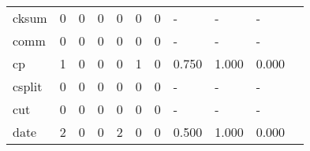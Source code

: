 \begin{longtable}{lp{1.2cm}p{1.2cm}p{1.2cm}p{1.2cm}p{1.2cm}p{1.2cm}p{1.2cm}p{1.2cm}p{1.2cm}p{1.2cm}}
cksum     &                                     0 &                                                  0 &                                                  0 &                                                  0 &                                                  0 &                                                  0 &                                             - &                                                  - &                                                  - \\
comm      &                                     0 &                                                  0 &                                                  0 &                                                  0 &                                                  0 &                                                  0 &                                             - &                                                  - &                                                  - \\
cp        &                                     1 &                                                  0 &                                                  0 &                                                  0 &                                                  1 &                                                  0 &                                         0.750 &                                              1.000 &                                              0.000 \\
csplit    &                                     0 &                                                  0 &                                                  0 &                                                  0 &                                                  0 &                                                  0 &                                             - &                                                  - &                                                  - \\
cut       &                                     0 &                                                  0 &                                                  0 &                                                  0 &                                                  0 &                                                  0 &                                             - &                                                  - &                                                  - \\
date      &                                     2 &                                                  0 &                                                  0 &                                                  2 &                                                  0 &                                                  0 &                                         0.500 &                                              1.000 &                                              0.000 \\

\end{longtable}
